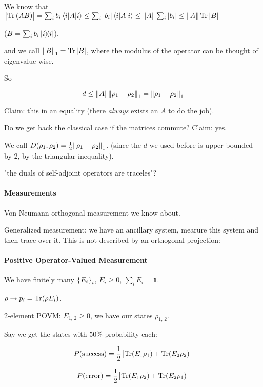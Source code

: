 We know that \(\abs{\Tr \qty(AB)} = \sum_i b_i \ev{A}{i} \leq \sum_i \abs{b_i} \ev{A}{i} \leq \norm{A} \sum_i \abs{b_i} \leq \norm{A} \Tr \abs{B}\)

(\(B = \sum_i b_i \ketbra{i}\)).

and we call \(\norm{B}_1 = \Tr \abs{B}\), where the modulus of the operator can be thought of eigenvalue-wise.

So

\begin{equation}
  d \leq \norm{A} \norm{\rho_1 - \rho_2}_1 = \norm{\rho_1 - \rho_2}_1
\end{equation}

Claim: this in an equality (there \emph{always} exists an $A$ to do the job).

Do we get back the classical case if the matrices commute? Claim: yes.

We call \(D(\rho_1, \rho_2) = \frac{1}{2} \norm{\rho_1 - \rho_2}_1\). (since the $d$ we used before is upper-bounded by 2, by the triangular inequality).

"the duals of self-adjoint operators are traceles"?

\paragraph{Measurements}
Von Neumann orthogonal measurement we know about.

Generalized measurement: we have an ancillary system, mearure this system and then trace over it. This is not described by an orthogonal projection:

\paragraph{Positive Operator-Valued Measurement}

We have finitely many \(\qty{E_i}_i\), \(E_i \geq 0\),  \(\sum_i E_i = \mathbb{1}\).

\(\rho \rightarrow p_i = \Tr (\rho E_i)\).

2-element POVM: \(E_{1, \, 2} \geq 0\), we have our states \(\rho_{1, \, 2}\).

Say we get the states with \(50\%\) probability each:

\begin{equation}
  P(\text{success}) = \frac{1}{2} \qty[\Tr(E_1 \rho_1) + \Tr(E_2 \rho_2)]
\end{equation}

\begin{equation}
  P(\text{error}) = \frac{1}{2} \qty[\Tr(E_1 \rho_2) + \Tr(E_2 \rho_1)]
\end{equation}

